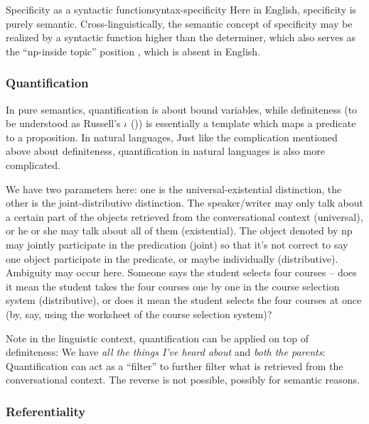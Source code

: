\documentclass[UTF8, a4paper, oneside, scheme=plain]{ctexrep}
\newcommand{\corpus}[1]{\emph{#1}}
\begin{document}
\begin{infobox}{Specificity as a syntactic function}{syntax-specificity}
    Here in English, 
    specificity is purely semantic.
    Cross-linguistically, the semantic concept of specificity 
    may be realized by a syntactic function
    higher than the determiner,
    which also serves as the ``\acs{np}-inside topic'' position 
    \citep{ihsane2001specific},
    which is absent in English.
\end{infobox}

\subsubsection{Quantification}

In pure semantics, quantification 
is about bound variables,
while definiteness 
(to be understood as Russell's $\iota$ ())
is essentially a template which 
maps a predicate to a proposition.
In natural languages,
Just like the complication mentioned above about definiteness,
quantification in natural languages is also more complicated.

We have two parameters here:
one is the universal-existential distinction,
the other is the joint-distributive distinction.
The speaker/writer may only talk about a certain part of the objects retrieved
from the conversational context (universal), 
or he or she may talk about all of them (existential).
The object denoted by \acs{np} may jointly participate in the predication (joint)
so that it's not correct to say 
one object participate in the predicate,
or maybe individually (distributive).
Ambiguity may occur here.
Someone says the student selects four courses -- 
does it mean the student takes the four courses one by one in the course selection system
(distributive), 
or does it mean the student selects the four courses at once 
(by, say, using the worksheet of the course selection system)?

Note in the linguistic context,
quantification can be applied on top of definiteness:
We have \corpus{all the things I've heard about} 
and \corpus{both the parents}:
Quantification can act as a ``filter'' 
to further filter what is retrieved from the conversational context.
The reverse is not possible, 
possibly for semantic reasons.

\subsubsection{Referentiality}\label{sec:semantic.ref}
\end{document}

